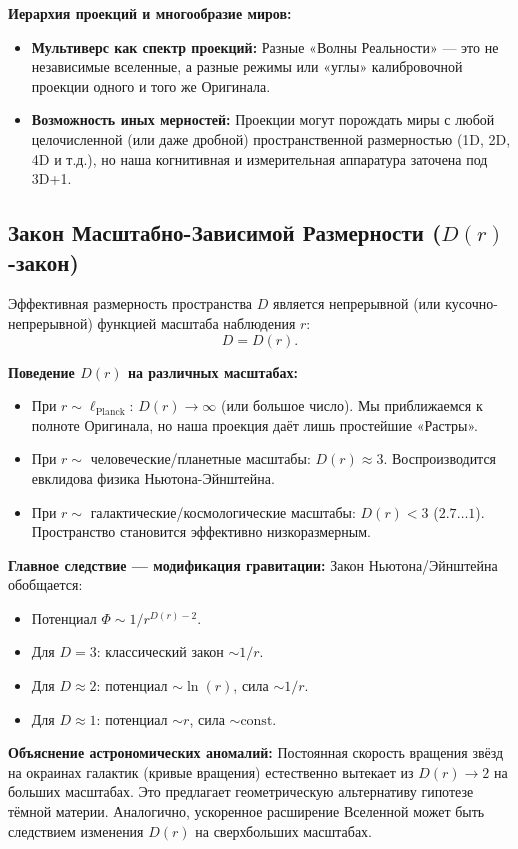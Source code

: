 \documentclass[a4paper,12pt]{article}
\begin{document}
\textbf{Иерархия проекций и многообразие миров:}
\begin{itemize}
	\item \textbf{Мультиверс как спектр проекций:} Разные «Волны Реальности» — это не независимые вселенные, а разные режимы или «углы» калибровочной проекции одного и того же Оригинала.
	\item \textbf{Возможность иных мерностей:} Проекции могут порождать миры с любой целочисленной (или даже дробной) пространственной размерностью (1D, 2D, 4D и т.д.), но наша когнитивная и измерительная аппаратура заточена под 3D+1.
\end{itemize}

\subsection{Закон Масштабно-Зависимой Размерности ($D(r)$-закон)}

Эффективная размерность пространства $D$ является непрерывной (или кусочно-непрерывной) функцией масштаба наблюдения $r$:
\[
D = D(r).
\]

\textbf{Поведение $D(r)$ на различных масштабах:}
\begin{itemize}
	\item При $r \sim \ell_{\text{Planck}}$: $D(r) \to \infty$ (или большое число). Мы приближаемся к полноте Оригинала, но наша проекция даёт лишь простейшие «Растры».
	\item При $r \sim$ человеческие/планетные масштабы: $D(r) \approx 3$. Воспроизводится евклидова физика Ньютона-Эйнштейна.
	\item При $r \sim$ галактические/космологические масштабы: $D(r) < 3$ ($2.7 \dots 1$). Пространство становится эффективно низкоразмерным.
\end{itemize}

\textbf{Главное следствие — модификация гравитации:} Закон Ньютона/Эйнштейна обобщается:
\begin{itemize}
	\item Потенциал $\Phi \sim 1/r^{D(r)-2}$.
	\item Для $D=3$: классический закон $\sim 1/r$.
	\item Для $D \approx 2$: потенциал $\sim \ln(r)$, сила $\sim 1/r$.
	\item Для $D \approx 1$: потенциал $\sim r$, сила $\sim \text{const}$.
\end{itemize}

\textbf{Объяснение астрономических аномалий:} Постоянная скорость вращения звёзд на окраинах галактик (кривые вращения) естественно вытекает из $D(r) \to 2$ на больших масштабах. Это предлагает геометрическую альтернативу гипотезе тёмной материи. Аналогично, ускоренное расширение Вселенной может быть следствием изменения $D(r)$ на сверхбольших масштабах.
\end{document}
